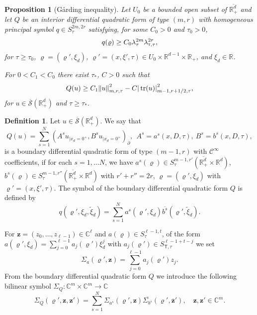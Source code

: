 \documentclass[10pt]{amsart}
\theoremstyle{plain}
\newtheorem{proposition}[theorem]{Proposition}
\theoremstyle{definition}
\newtheorem{definition}[theorem]{Definition}
\def\R{\mathbb{R}}
\def\C{\mathbb{C}}
\let\Bquad Q
\let\bquad q
\let\y\varrho
\let \Re \relax
\DeclareMathOperator{\Re}{Re}
\newcommand{\ovl}[1]{\overline{#1}}
\newcommand{\inp}[2]{(#1, #2)}
\newcommand{\un}[1]{\Sigma_{#1}}
\newcommand{\z}{\boldsymbol{z}}
\newcommand{\br}{\ensuremath{_{|x_d=0^+}}}
\newcommand{\Normsc}[2]{{\| #1 \|}_{#2, \tau}}
\newcommand{\normsc}[2]{{| #1 |}_{#2, \tau}}
\newcommand{\lsc}{\lambda_\tau}
\newcommand{\lsct}{\lambda_{{\scriptscriptstyle{\mathsf T}},\tau}}
\newcommand{\Ssc}{S_\tau}
\newcommand{\Ssct}{S_{{\scriptscriptstyle{\mathsf T}},\tau}}
\newcommand{\Con}{\ensuremath{\mathscr C}}
\newcommand{\Cinf}{\ensuremath{\Con^\infty}}
\newcommand{\Sbarp}{\ensuremath{\overline{\mathscr{S}}(\Rdp)}}
\newcommand{\Rdp}{\R^d_+}
\DeclareMathOperator{\trace}{tr}
\begin{document}
\begin{proposition}[G{\aa}rding inequality]
\label{prop: Gaarding quadratic forms local}
Let $U_0$ be a bounded open subset
of $\ovl{\Rdp}$ and let $Q$ be an interior differential quadratic
form of type $(m,r)$ with homogeneous
principal symbol $q\in \Ssc^{2m,2 r}$ satisfying, for some $C_0>0$
and $\tau_0>0$,
\begin{equation*}
\Re q(\y)\geq C_0 \lsc^{2m} \lsct^{2r},
\end{equation*}
for $\tau \geq \tau_0$, $\y = (\y',\xi_d)$,
$\y'=(x,\xi',\tau)\in U_0 \times \R^{d-1} \times \R_+$, and $\xi_d\in\R$.

For $0< C_1 < C_0$ there exist $\tau_\ast$, $C>0$ such that
\begin{equation*}
\Re Q(u)
\geq
C_1\Normsc{ u}{m,r}^2
-C\normsc{\trace(u)}{m-1,r+1/2}^2,
\end{equation*}
for $u\in \Sbarp$ and $\tau\geq \tau_\ast$.
\end{proposition}

\label{sec: Boundary differential quadratic forms}

\begin{definition}
\label{def: boundary quadratic form}
Let $u\in \Sbarp$. We say that
\begin{equation*}
\Bquad(u)=\sum_{s=1}^N\inp{A^s u\br}{B^s u\br}_\partial,
\ \ A^s = a^s(x,D,\tau), \ B^s = b^s(x,D,\tau),
\end{equation*}
is a boundary differential quadratic form of type $(m-1,r)$ with $\Cinf$
coefficients, if for each $s=1,\dots N$, we have $a^s(\y)\in
\Ssc^{m-1,r'}(\ovl{\Rdp} \times\R^d)$, $b^s(\y)\in
\Ssc^{m-1,r''}(\ovl{\Rdp} \times\R^d)$ with $r'+r''=2
r$, $\y=(\y',\xi_d)$ with $\y'=(x,\xi',\tau)$. The symbol of the
boundary differential quadratic form $\Bquad$ is defined by
\begin{equation*}
\bquad(\y',\xi_d,\tilde{\xi}_d)=\sum_{s=1}^N
a^{s}(\y',\xi_d)\ovl{b^s}(\y',\tilde{\xi}_d).
\end{equation*}
\end{definition}

For $\z=(z_0,\dots,z_{\ell-1})\in\C^\ell$ and $a(\y)\in
\Ssc^{\ell-1,t}$, of the form
$a(\y',\xi_d) = \sum_{j=0}^{\ell-1} a_j(\y') \xi_d^j$ with $a_j(\y') \in \Ssct^{\ell-1+t-j}$
we set
\begin{equation}
\label{eq: symbol z}
\un{a}(\y',\z)=\sum_{j=0}^{\ell-1}a_j(\y')z_j.
\end{equation}
From the boundary differential quadratic form $\Bquad$ we introduce the following
bilinear symbol $\un{\Bquad}:\C^m\times\C^m\to \C $
\begin{equation}
\label{eq: bilinear symbol-boundary quadratic form}
\un{\Bquad}(\y',\z,\z')
=\sum_{s=1}^N \un{a^s}(\y',\z)\ovl{\un{b^s}}(\y',\ovl{\z}'),
\quad \z,\z'\in\C^m.
\end{equation}
\end{document}
